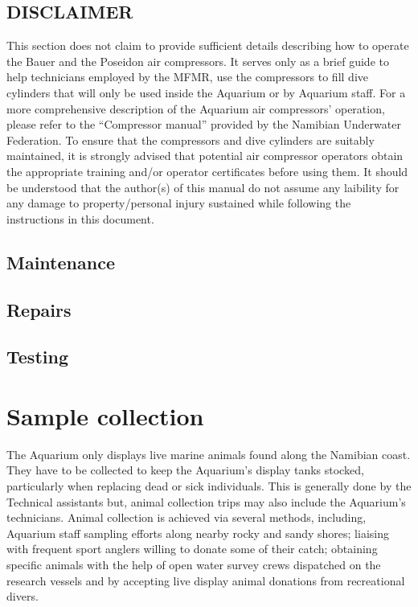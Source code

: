 \documentclass[
  12pt,
]{report}
\begin{document}
\hypertarget{disclaimer}{%
\section*{\texorpdfstring{{DISCLAIMER}}{DISCLAIMER}}\label{disclaimer}}

{This section does not claim to provide sufficient details describing
how to operate the Bauer and the Poseidon air compressors. It serves
only as a brief guide to help technicians employed by the MFMR, use the
compressors to fill dive cylinders that will only be used inside the
Aquarium or by Aquarium staff. For a more comprehensive description of
the Aquarium air compressors' operation, please refer to the
``Compressor manual'' provided by the Namibian Underwater Federation. To
ensure that the compressors and dive cylinders are suitably maintained,
it is strongly advised that potential air compressor operators obtain
the appropriate training and/or operator certificates before using them.
It should be understood that the author(s) of this manual do not assume
any laibility for any damage to property/personal injury sustained while
following the instructions in this document.}

\hypertarget{maintenance-1}{%
\section{Maintenance}\label{maintenance-1}}

\hypertarget{repairs-4}{%
\section{Repairs}\label{repairs-4}}

\hypertarget{testing}{%
\section{Testing}\label{testing}}

\newpage

\hypertarget{sec-sample-collection}{%
\chapter{Sample collection}\label{sec-sample-collection}}

The Aquarium only displays live marine animals found along the Namibian
coast. They have to be collected to keep the Aquarium's display tanks
stocked, particularly when replacing dead or sick individuals. This is
generally done by the Technical assistants but, animal collection trips
may also include the Aquarium's technicians. Animal collection is
achieved via several methods, including, Aquarium staff sampling efforts
along nearby rocky and sandy shores; liaising with frequent sport
anglers willing to donate some of their catch; obtaining specific
animals with the help of open water survey crews dispatched on the
research vessels and by accepting live display animal donations from
recreational divers.
\end{document}
